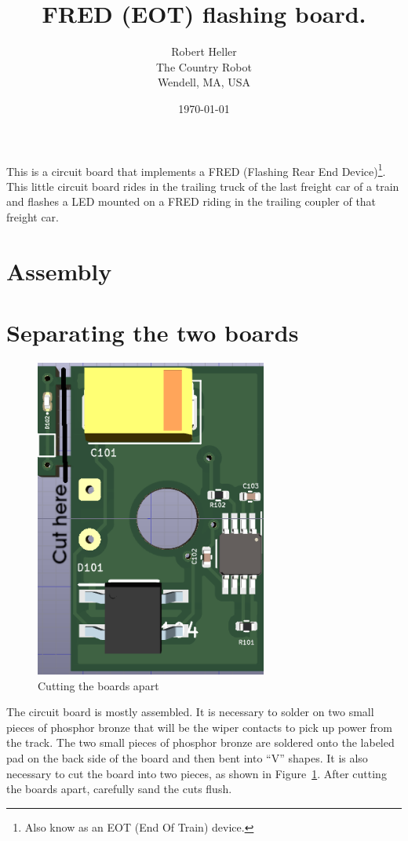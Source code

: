\documentclass[12pt,twoside,letterpaper]{article}
\title{FRED (EOT) flashing board.}
\author{Robert Heller \\ The Country Robot \\ Wendell, MA, USA}
\date{\today}
\begin{document}
\maketitle

This is a circuit board that implements a FRED (Flashing Rear End 
Device)\footnote{Also know as an EOT (End Of Train) device.}. This little 
circuit board rides in the trailing truck of the last freight car of a train 
and flashes a LED mounted on a FRED riding in the trailing coupler of that 
freight car.

\section{Assembly}


\section{Separating the two boards}
\begin{figure}[hbpt]\begin{centering}%
\includegraphics[width=3in]{FRED_Board3D_Top_cut.png}
\caption{Cutting the boards apart}
\label{fig:boardcut}
\end{centering}\end{figure}
The circuit board is mostly assembled.  It is necessary to solder on two small 
pieces of phosphor bronze that will be the wiper contacts to pick up power 
from the track. The two small pieces of phosphor bronze are soldered onto the 
labeled pad on the back side of the board and then bent into ``V'' shapes. It 
is also necessary to cut the board into two pieces, as shown in 
Figure~\ref{fig:boardcut}. After cutting the boards apart, carefully sand the 
cuts flush.
\end{document}
